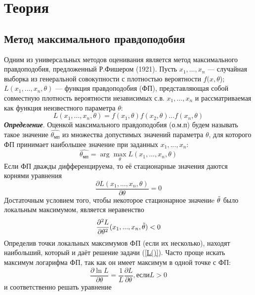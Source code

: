 \documentclass{article}
\begin{document}
\section{Теория}

\subsection{Метод максимального правдоподобия}
\noindent Одним из универсальных методов оценивания является метод максимального правдоподобия, предложенный Р.Фишером (1921).
Пусть $x_{1},...,x_{n}$ — случайная выборка из генеральной совокупности с плотностью вероятности $f(x,\theta$); $L(x_{1},... ,x_{n}, \theta)$ — функция правдоподобия (ФП), представляющая собой совместную плотность вероятности независимых с.в. $x_{1}, ... ,x_{n}$ и рассматриваемая как функция неизвестного параметра $\theta$:
\begin{equation}
L(x_{1},...,x_{n},\theta) = f(x_{1},\theta)f(x_{2},\theta)...f(x_{n}, \theta)
\label{L()}
\end{equation}
\textbf{\textit{Определение}}. Оценкой максимального правдоподобия (о.м.п) будем называть такое значение $\hat{\theta_{мп}}$ из множества допустимых значений параметра $\theta$, для которого ФП принимает наибольшее значение при заданных $x_{1},...,x_{n}$:
\begin{equation}
\hat{\theta_{мп}} = \arg \max_{\theta}L(x_{1},...,x_{n},\theta)
\label{theta_mp}
\end{equation}
Если ФП дважды дифференцируема, то её стационарные значения даются корнями уравнения
\begin{equation}
\frac{\partial L(x_{1},...,x_{n},\theta)}{\partial \theta} = 0
\label{eq_min}
\end{equation}
Достаточным условием того, чтобы некоторое стационарное значениe $\Tilde{\theta}$ было локальным максимумом, является неравенство
\begin{equation}
\frac{\partial^{2}L}{\partial \theta^{2}}(x_{1},...,x_{n},\Tilde{\theta}) < 0
\label{ineq_min}
\end{equation}
Определив точки локальных максимумов ФП (если их несколько), находят наибольший, который и даёт решение задачи (\ref{L()}).
Часто проще искать максимум логарифма ФП, так как он имеет максимум в одной точке с ФП:
\begin{equation}
\frac{\partial \ln L}{\partial \theta}=\frac{1}{L}\frac{\partial L}{\partial \theta}, если L > 0
\label{log_max}
\end{equation}
и соответственно решать уравнение
\end{document}
